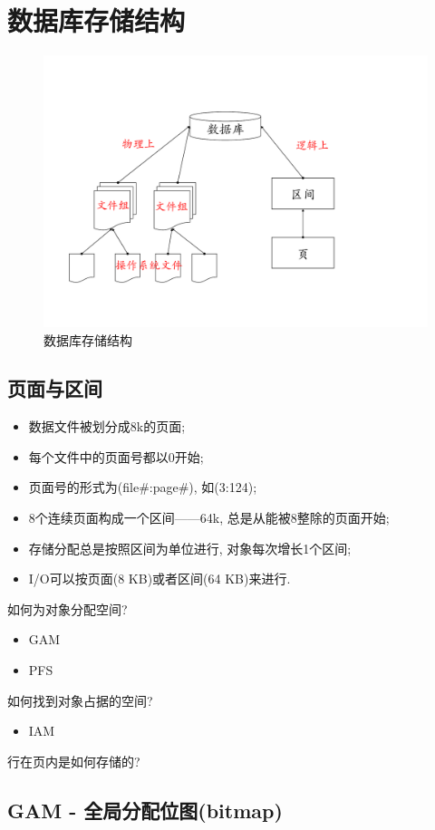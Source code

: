 \section{数据库存储结构}

\begin{figure}[H]
    \centering
    \includegraphics[width=.6\textwidth]{figure/数据库结构.pdf}
    \caption{数据库存储结构}
\end{figure}

\subsection{页面与区间}

\begin{itemize}
    \item 数据文件被划分成8k的页面;
    \item 每个文件中的页面号都以0开始;
    \item 页面号的形式为(file\#:page\#), 如(3:124);
    \item 8个连续页面构成一个区间——64k, 总是从能被8整除的页面开始;
    \item 存储分配总是按照区间为单位进行, 对象每次增长1个区间;
    \item I/O可以按页面(8 KB)或者区间(64 KB)来进行.
\end{itemize}

如何为对象分配空间?
\begin{itemize}
    \item GAM
    \item PFS
\end{itemize}

如何找到对象占据的空间?
\begin{itemize}
    \item IAM
\end{itemize}

行在页内是如何存储的?

\subsection{GAM - 全局分配位图(bitmap)}

